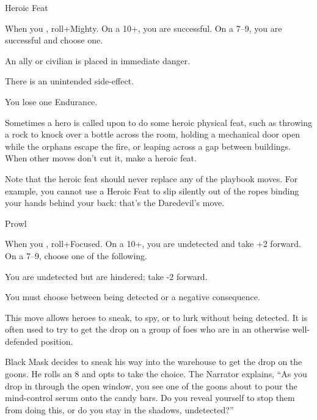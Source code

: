 \begin{movedef}{Heroic Feat}
{
  When you , roll+Mighty. On a 10+, you are
  successful. On a 7--9, you are successful and choose one.
  \begin{choices}
  \item An ally or civilian is placed in immediate danger.
  \item There is an unintended side-effect.
  \item You lose one Endurance.
  \end{choices}
  \onamiss{}
}
{
  Sometimes a hero is called upon to do some heroic physical feat,
  such as throwing a rock to knock over a bottle across the room,
  holding a mechanical door open while the orphans escape the fire,
  or leaping across a gap between buildings.
  When other moves don't cut it, make a heroic feat.

  Note that the heroic feat should never replace any of the
  playbook moves. For example, you cannot use a Heroic
  Feat to slip silently out of the ropes binding your hands
  behind your back: that's the Daredevil's 
  move. 
}
\end{movedef}

\begin{movedef}{Prowl}
  {
    When you , roll+Focused. On a 10+, you are undetected and take +2 forward. On a 7--9, choose one of the following.
    \begin{choices}
    \item You are undetected but are hindered; take -2 forward.
    \item You must choose between being detected or a negative consequence.
    \end{choices}
    \onamiss{}    
  }
  {
    This move allows heroes to sneak, to spy, or to lurk without being
    detected. It is often used to try to get the drop on a group
    of foes who are in an otherwise well-defended position.
    
    \begin{example}
      Black Mask decides to sneak his way into the warehouse to get
      the drop on the goons. He rolls an 8 and opts to take the choice.
      The Narrator explains, ``As you drop in through the open window,
      you see one of the goons about to pour the mind-control serum
      onto the candy bars. Do you reveal yourself to stop them
      from doing this, or do you stay in the shadows, undetected?''
    \end{example}
  }
\end{movedef}

